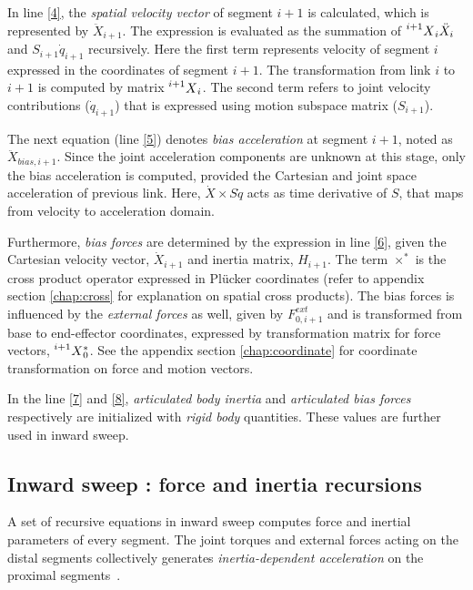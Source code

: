 In line \ref{4}, the \textit{spatial velocity vector} of segment $i+1$ is calculated, which is represented by $\ddot{X}_{i+1}$. The expression is evaluated as the summation of $\prescript{i+1}{}{X}_i\ddot{X}_i$ and  $S_{i+1}\dot{q}_{i+1}$ recursively. Here the first term represents velocity of segment $i$ expressed in the coordinates of segment $i+1$. The transformation from link $i$ to $i+1$ is computed by matrix $\prescript{i+1}{}{X}_{i}$. The second term refers to joint velocity contributions ($\dot{q}_{i+1}$) that is expressed using motion subspace matrix ($S_{i+1}$).

	The next equation (line \ref{5}) denotes \textit{bias acceleration} at segment $i+1$, noted as $\ddot{X}_{bias, i+1}$. Since the joint acceleration components are unknown at this stage, only the bias acceleration is computed, provided the Cartesian and joint space acceleration of previous link. Here, $\dot{X} \times S \dot{q}$ acts as time derivative of $S$, that maps from velocity to acceleration domain. 

Furthermore, \textit{bias forces} are determined by the expression in line \ref{6}, given the Cartesian velocity vector, $\dot{X}_{i+1}$ and inertia matrix, $H_{i+1}$. The term $\times^*$ is the cross product operator expressed in Pl{\"u}cker coordinates (refer to appendix section \ref{chap:cross} for explanation on spatial cross products). The bias forces is influenced by the \textit{external forces} as well, given by $F^{ext}_{0, i+1}$ and is transformed from base to end-effector coordinates, expressed by transformation matrix for force vectors, $\prescript{i+1}{}{X}_0^*$. See the appendix section \ref{chap:coordinate} for coordinate transformation on force and motion vectors.

In the line \ref{7} and \ref{8}, \textit{articulated body inertia} and \textit{articulated bias forces} respectively are initialized with \textit{rigid body} quantities. These values are further used in inward sweep.

\subsection{Inward sweep : force and inertia recursions} \label{inward-sweep}

A set of recursive equations in inward sweep computes force and inertial parameters of every segment. The joint torques and external forces acting on the distal segments collectively generates \textit{inertia-dependent acceleration} on the proximal segments~\cite{shakhimardanov2015composable}.


